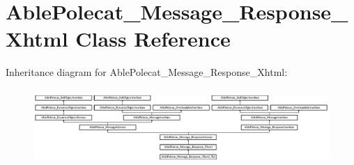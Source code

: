 \hypertarget{class_able_polecat___message___response___xhtml}{}\section{Able\+Polecat\+\_\+\+Message\+\_\+\+Response\+\_\+\+Xhtml Class Reference}
\label{class_able_polecat___message___response___xhtml}
Inheritance diagram for Able\+Polecat\+\_\+\+Message\+\_\+\+Response\+\_\+\+Xhtml\+:\begin{figure}[H]
\begin{center}
\leavevmode
\includegraphics[height=2.903704cm]{class_able_polecat___message___response___xhtml}
\end{center}
\end{figure}
